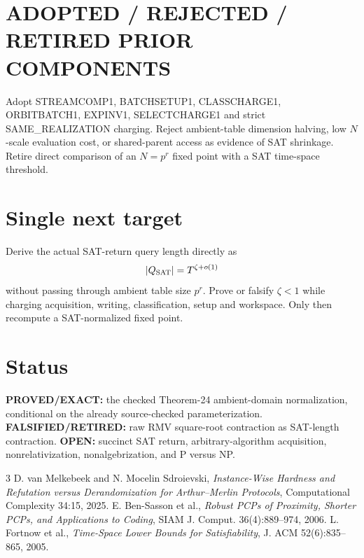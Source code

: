 \documentclass[11pt]{article}
\begin{document}
\section*{ADOPTED / REJECTED / RETIRED PRIOR COMPONENTS}
Adopt STREAMCOMP1, BATCHSETUP1, CLASSCHARGE1, ORBITBATCH1, EXPINV1, SELECTCHARGE1 and strict SAME\_REALIZATION charging. Reject ambient-table dimension halving, low \(N\)-scale evaluation cost, or shared-parent access as evidence of SAT shrinkage. Retire direct comparison of an \(N=p^r\) fixed point with a SAT time-space threshold.

\section*{Single next target}
Derive the actual SAT-return query length directly as
\[
|Q_{\rm SAT}|=T^{\zeta+o(1)}
\]
without passing through ambient table size \(p^r\). Prove or falsify \(\zeta<1\) while charging acquisition, writing, classification, setup and workspace. Only then recompute a SAT-normalized fixed point.

\section*{Status}
\textbf{PROVED/EXACT:} the checked Theorem-24 ambient-domain normalization, conditional on the already source-checked parameterization. \textbf{FALSIFIED/RETIRED:} raw RMV square-root contraction as SAT-length contraction. \textbf{OPEN:} succinct SAT return, arbitrary-algorithm acquisition, nonrelativization, nonalgebrization, and P versus NP.

\begin{thebibliography}{3}
 D. van Melkebeek and N. Mocelin Sdroievski, \emph{Instance-Wise Hardness and Refutation versus Derandomization for Arthur--Merlin Protocols}, Computational Complexity 34:15, 2025.
 E. Ben-Sasson et al., \emph{Robust PCPs of Proximity, Shorter PCPs, and Applications to Coding}, SIAM J. Comput. 36(4):889--974, 2006.
 L. Fortnow et al., \emph{Time-Space Lower Bounds for Satisfiability}, J. ACM 52(6):835--865, 2005.
\end{thebibliography}
\end{document}
